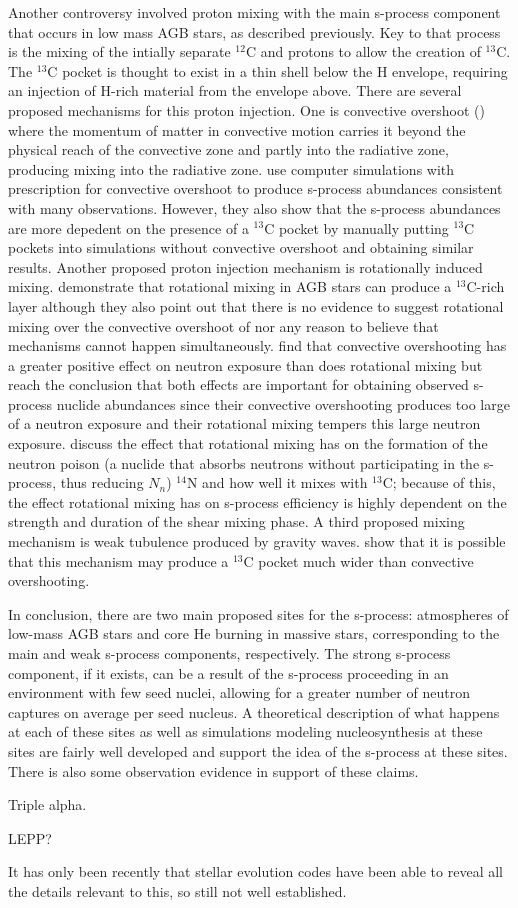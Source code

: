 Another controversy involved proton mixing with the main s-process
component that occurs in low mass AGB stars, as described previously.
Key to that process is the mixing of the intially separate $^{12}$C
and protons to allow the creation of $^{13}$C.  The $^{13}$C pocket is
thought to exist in a thin shell below the H envelope, requiring an
injection of H-rich material from the envelope above. There are
several proposed mechanisms for this proton injection.  One is
convective overshoot (\citealt{herwigetal1997}) where the momentum of
matter in convective motion carries it beyond the physical reach of
the convective zone and partly into the radiative zone, producing
mixing into the radiative zone. \cite{lugaroetal2003} use computer
simulations with prescription for convective overshoot to produce
s-process abundances consistent with many observations. However, they 
also show that the s-process abundances are more depedent on the
presence of a $^{13}$C pocket by manually putting $^{13}$C pockets
into simulations without convective overshoot and obtaining similar
results. Another proposed proton injection mechanism is rotationally
induced mixing.  \cite{langeretal1999} demonstrate that rotational
mixing in AGB stars can produce a $^{13}$C-rich layer although they
also point out that there is no evidence to suggest rotational mixing
over the convective overshoot of \cite{herwigetal1997} nor any reason
to believe that mechanisms cannot happen
simultaneously.  \cite{herwig2003} find that convective overshooting
has a greater positive effect on neutron exposure than does rotational
mixing but reach the conclusion that both effects are important for
obtaining observed s-process nuclide abundances since their convective
overshooting produces too large of a neutron exposure and their
rotational mixing tempers this large neutron
exposure.  \cite{siess2004} discuss the effect that rotational mixing
has on the formation of the neutron poison (a nuclide that absorbs
neutrons without participating in the s-process, thus reducing $N_n$)
$^{14}$N and how well it mixes with $^{13}$C; because of this, the
effect rotational mixing has on s-process efficiency is highly
dependent on the strength and duration of the shear mixing phase.  A
third proposed mixing mechanism is weak tubulence produced by gravity
waves.  \cite{denissenkov2003} show that it is possible that this mechanism may
produce a $^{13}$C pocket much wider than convective overshooting.

In conclusion, there are two main proposed sites for the s-process:
atmospheres of low-mass AGB stars and core He burning in massive
stars, corresponding to the main and weak s-process components,
respectively.  The strong s-process component, if it exists, can be a
result of the s-process proceeding in an environment with few seed
nuclei, allowing for a greater number of neutron captures on average
per seed nucleus.  A theoretical description of what happens at each
of these sites as well as simulations modeling nucleosynthesis at
these sites are fairly well developed and support the idea of
the s-process at these sites.  There is also some observation evidence
in support of these claims.




Triple alpha.

LEPP?

It has only been recently that stellar evolution codes have been able
to reveal all the details relevant to this, so still not well established.
